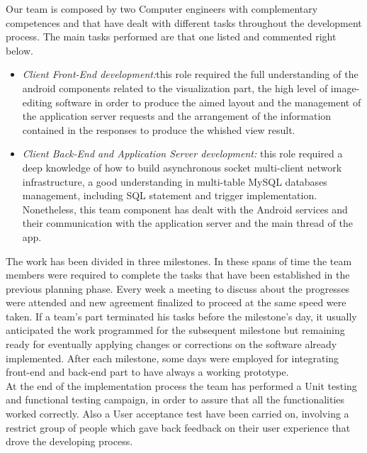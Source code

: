 Our team is composed by two Computer engineers with complementary competences and that have dealt with different tasks throughout the development process. The main tasks performed are that one listed and commented right below.

\begin{itemize}
\item \emph{Client Front-End development:}this role required the full understanding of the android components related to the visualization part, the high level of image-editing software in order to produce the aimed layout and the management of the application server requests and the arrangement of the information contained in the responses to produce the whished view result. 

\item \emph{Client Back-End and Application Server development:} this role required a deep knowledge of how to build asynchronous socket multi-client network infrastructure, a good understanding in multi-table MySQL databases management, including SQL statement and trigger implementation. Nonetheless, this team component has dealt with the Android services and their communication with the application server and the main thread of the app.
\end{itemize}

The work has been divided in three milestones. In these spans of time the team members were required to complete the tasks that have been established in the previous planning phase. Every week a meeting to discuss about the progresses were attended and new agreement finalized to proceed at the same speed were taken. If a team’s part terminated his tasks before the milestone’s day, it usually anticipated the work programmed for the subsequent milestone but remaining ready for eventually applying changes or corrections on the software already implemented. After each milestone, some days were employed for integrating front-end and back-end part to have always a working prototype. \\
At the end of the implementation process the team has performed a Unit testing and functional testing campaign, in order to assure that all the functionalities worked correctly. Also a User acceptance test have been carried on, involving a restrict group of people which gave back feedback on their user experience that drove the developing process.

